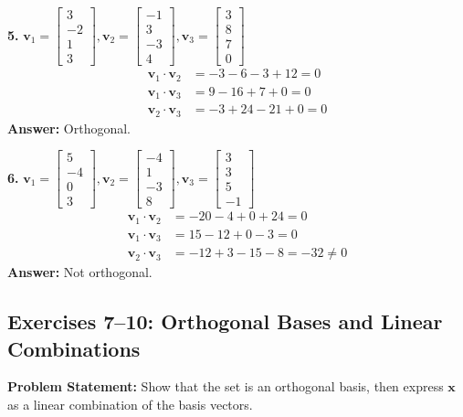 \documentclass[11pt, letterpaper]{article}
\theoremstyle{definition}
\theoremstyle{remark}
\begin{document}
\textbf{5.} $\mathbf{v}_1 = \begin{bmatrix} 3 \\ -2 \\ 1 \\ 3 \end{bmatrix}, \mathbf{v}_2 = \begin{bmatrix} -1 \\ 3 \\ -3 \\ 4 \end{bmatrix}, \mathbf{v}_3 = \begin{bmatrix} 3 \\ 8 \\ 7 \\ 0 \end{bmatrix}$
\begin{align*}
    \mathbf{v}_1 \cdot \mathbf{v}_2 &= -3 - 6 - 3 + 12 = 0 \\
    \mathbf{v}_1 \cdot \mathbf{v}_3 &= 9 - 16 + 7 + 0 = 0 \\
    \mathbf{v}_2 \cdot \mathbf{v}_3 &= -3 + 24 - 21 + 0 = 0
\end{align*}
\textbf{Answer:} Orthogonal.

\textbf{6.} $\mathbf{v}_1 = \begin{bmatrix} 5 \\ -4 \\ 0 \\ 3 \end{bmatrix}, \mathbf{v}_2 = \begin{bmatrix} -4 \\ 1 \\ -3 \\ 8 \end{bmatrix}, \mathbf{v}_3 = \begin{bmatrix} 3 \\ 3 \\ 5 \\ -1 \end{bmatrix}$
\begin{align*}
    \mathbf{v}_1 \cdot \mathbf{v}_2 &= -20 - 4 + 0 + 24 = 0 \\
    \mathbf{v}_1 \cdot \mathbf{v}_3 &= 15 - 12 + 0 - 3 = 0 \\
    \mathbf{v}_2 \cdot \mathbf{v}_3 &= -12 + 3 - 15 - 8 = -32 \neq 0
\end{align*}
\textbf{Answer:} Not orthogonal.

\subsection{Exercises 7--10: Orthogonal Bases and Linear Combinations}
\textbf{Problem Statement:} Show that the set is an orthogonal basis, then express $\mathbf{x}$ as a linear combination of the basis vectors.
\end{document}
